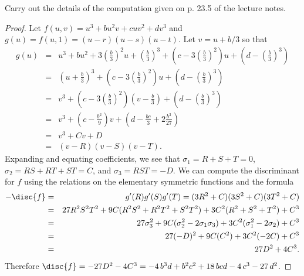 \documentclass[10pt]{amsart}
\begin{document}
\begin{thm}
  Carry out the details of the computation given on p. 23.5 of the lecture notes.

  \begin{proof}
    Let $f(u,v) = u^3 + bu^2v + cuv^2 + dv^3$ and $g(u) = f(u,1) = (u - r)(u - s)(u - t)$.
    Let $v = u + b/3$ so that
    \begin{eqnarray*}
      g(u) &=& u^3 + bu^2 + 3\left(\frac{b}{3}\right)^2u + \left(\frac{b}{3}\right)^3 + \left(c - 3\left(\frac{b}{3}\right)^2\right)u  + \left(d - \left(\frac{b}{3}\right)^3\right)\\
      &=& \left(u + \frac{b}{3}\right)^3 + \left(c - 3\left(\frac{b}{3}\right)^2\right)u + \left(d - \left(\frac{b}{3}\right)^3\right)\\
      &=& v^3 + \left(c - 3\left(\frac{b}{3}\right)^2\right)\left(v - \frac{b}{3}\right) + \left(d - \left(\frac{b}{3}\right)^3\right)\\
      &=& v^3 + \left(c - \frac{b^2}{9}\right)v + \left(d - \frac{bc}{3} + 2\frac{b^3}{27}\right)\\
      &=& v^3 + Cv + D\\
      &=& (v - R)(v - S)(v - T).
    \end{eqnarray*}
    Expanding and equating coefficients, we see that $\sigma_1 = R + S + T = 0$, $\sigma_2 = RS + RT + ST = C$, and $\sigma_3 = RST = - D$.
    We can compute the discriminant for $f$ using the relations on the elementary symmetric functions and the formula
    \begin{eqnarray*}
      -\disc{f} &=& g^\prime(R)g^\prime(S)g^\prime(T) = (3R^2 + C)(3S^2 + C)(3T^2 + C)\\
      &=& 27R^2S^2T^2 + 9C(R^2S^2 + R^2T^2 + S^2T^2) + 3C^2(R^2 + S^2 + T^2) + C^3\\
      &=& 27\sigma_3^2 + 9C(\sigma_2^2 - 2\sigma_1\sigma_3) + 3C^2(\sigma_1^2 - 2\sigma_2) + C^3\\
      &=& 27(-D)^2 + 9C(C^2) + 3C^2(-2C) + C^3\\
      &=& 27D^2 + 4C^3.
    \end{eqnarray*}
    Therefore $\disc{f} = -27D^2 - 4C^3 = -4 \, b^{3} d + b^{2} c^{2} + 18 \, b c d - 4 \, c^{3} - 27 \, d^{2}$.
  \end{proof}
\end{thm}
\end{document}
